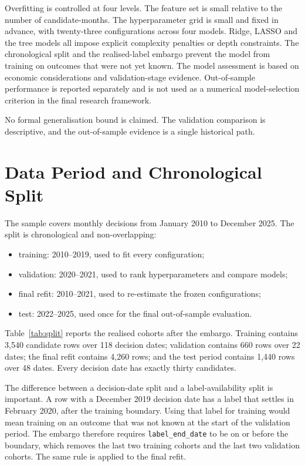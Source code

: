 \documentclass[11pt,a4paper]{article}
\begin{document}
Overfitting is controlled at four levels. The feature set is small relative to the number of candidate-months. The hyperparameter grid is small and fixed in advance, with twenty-three configurations across four models. Ridge, LASSO and the tree models all impose explicit complexity penalties or depth constraints. The chronological split and the realised-label embargo prevent the model from training on outcomes that were not yet known. The model assessment is based on economic considerations and validation-stage evidence. Out-of-sample performance is reported separately and is not used as a numerical model-selection criterion in the final research framework.

No formal generalisation bound is claimed. The validation comparison is descriptive, and the out-of-sample evidence is a single historical path.


\section{Data Period and Chronological Split}
\label{sec:split}

The sample covers monthly decisions from January 2010 to December 2025. The split is chronological and non-overlapping:

\begin{itemize}[leftmargin=1.2em,itemsep=2pt]
\item training: 2010--2019, used to fit every configuration;
\item validation: 2020--2021, used to rank hyperparameters and compare models;
\item final refit: 2010--2021, used to re-estimate the frozen configurations;
\item test: 2022--2025, used once for the final out-of-sample evaluation.
\end{itemize}

Table~\ref{tab:split} reports the realised cohorts after the embargo. Training contains 3,540 candidate rows over 118 decision dates; validation contains 660 rows over 22 dates; the final refit contains 4,260 rows; and the test period contains 1,440 rows over 48 dates. Every decision date has exactly thirty candidates.



The difference between a decision-date split and a label-availability split is important. A row with a December 2019 decision date has a label that settles in February 2020, after the training boundary. Using that label for training would mean training on an outcome that was not known at the start of the validation period. The embargo therefore requires \texttt{label\_end\_date} to be on or before the boundary, which removes the last two training cohorts and the last two validation cohorts. The same rule is applied to the final refit.
\end{document}

